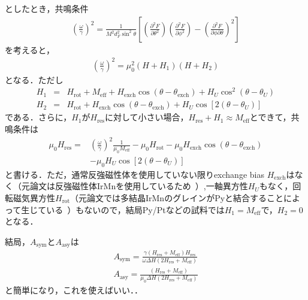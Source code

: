 \documentclass[11pt]{jbook}
\begin{document}
としたとき，共鳴条件
\begin{eqnarray}
\left(\frac{\omega}{\gamma}\right)^{2}=\frac{1}{M^{2} d_{F}^{2} \sin ^{2} \theta}\left[\left(\frac{\partial^{2} F}{\partial \theta^{2}}\right)\left(\frac{\partial^{2} F}{\partial \phi^{2}}\right)-\left(\frac{\partial^{2} F}{\partial \phi \partial \theta}\right)^{2}\right]
\end{eqnarray}
を考えると，
\begin{eqnarray}
\left(\frac{\omega}{\gamma}\right)^{2}=\mu_{0}^{2}\left(H+H_{1}\right)\left(H+H_{2}\right)
\end{eqnarray}
となる．ただし
\begin{eqnarray}
H_{1}&=&H_{\mathrm{rot}}+M_{\mathrm{eff}}+H_{\mathrm{exch}} \cos \left(\theta-\theta_{\mathrm{exch}}\right)+H_{U} \cos ^{2}\left(\theta-\theta_{U}\right) \\
H_{2}&=&H_{\mathrm{rot}}+H_{\mathrm{exch}} \cos \left(\theta-\theta_{\mathrm{exch}}\right)+H_{U} \cos \left[2\left(\theta-\theta_{U}\right)\right]
\end{eqnarray}
である．さらに，$H_1$が$H_\mathrm{res}$に対して小さい場合，$H_\mathrm{res}+H_1 \approx M_\mathrm{eff}$とできて，共鳴条件は
\begin{eqnarray}
\mu_{0} H_{\mathrm{res}}=&\nonumber \left(\frac{\omega}{\gamma}\right)^{2} \frac{1}{\mu_{0} M_{\mathrm{eff}}}-\mu_{0} H_{\mathrm{rot}}-\mu_{0} H_{\mathrm{exch}} \cos \left(\theta-\theta_{\mathrm{exch}}\right) \\
&-\mu_{0} H_{U} \cos \left[2\left(\theta-\theta_{U}\right)\right]
\end{eqnarray}
と書ける．ただ，通常反強磁性体を使用していない限りexchange bias $H_{\mathrm{exch}}$はなく（元論文は反強磁性体IrMnを使用しているため~\cite{PhysRevB.92.214406}）,一軸異方性$H_{U}$もなく，回転磁気異方性$H_\mathrm{rot}$（元論文では多結晶IrMnのグレインがPyと結合することによって生じている~\cite{PhysRevB.92.214406}）もないので，結局Py/Ptなどの試料では$H_1=M_\mathrm{eff}$で，$H_2=0$となる．


結局，$A_{\mathrm{sym}}$と$A_{\mathrm{asy}}$は
\begin{eqnarray}
A_{\mathrm{sym}}=\frac{\gamma\left(H_{\mathrm{res}}+M_\mathrm{eff}\right)H_{\mathrm{res}}}{\omega \Delta H\left(2 H_{\mathrm{res}}+M_\mathrm{eff}\right)} \\
A_{\mathrm{asy}}=\frac{\left(H_{\mathrm{res}}+M_\mathrm{eff}\right)}{\mu_{0} \Delta H\left(2 H_{\mathrm{res}}+M_\mathrm{eff}\right)}
\end{eqnarray}
と簡単になり，これを使えばいい．．
\end{document}
